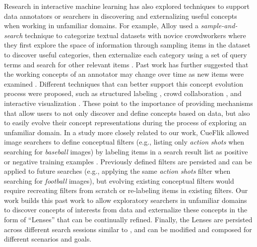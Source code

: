 Research in interactive machine learning has also explored techniques to support data annotators or searchers in discovering and externalizing useful concepts when working in unfamiliar domains. 
For example, Alloy used a \emph{sample-and-search} technique to categorize textual datasets with novice crowdworkers where they first explore the space of information through sampling items in the dataset to discover useful categories, then externalize each category using a set of query terms and search for other relevant items \cite{alloy}.
Past work has further suggested that the working concepts of an annotator may change over time as new items were examined \cite{kulesza2014structured}. Different techniques that can better support this concept evolution process were proposed, such as structured labeling \cite{kulesza2014structured}, crowd collaboration \cite{Chang:2017:Revolt}, and interactive visualization \cite{chen2018anchorviz}.  These point to the importance of providing mechanisms that allow users to not only discover and define concepts based on data, but also to easily evolve their concept representations during the process of exploring an unfamiliar domain.
In a study more closely related to our work, CueFlik allowed image searchers to define conceptual filters (e.g., listing only \emph{action shots} when searching for \emph{baseball} images) by labeling items in a search result list as positive or negative training examples \cite{fogarty2008cueflik}. Previously defined filters are persisted and can be applied to future searches (e.g., applying the same \emph{action shots} filter when searching for \emph{football} images), but evolving existing conceptual filters would require recreating filters from scratch or re-labeling items in existing filters.
Our work builds this past work to allow exploratory searchers in unfamiliar domains to discover concepts of interests from data and externalize these concepts in the form of ``Lenses'' that can be continually refined. Finally, the Lenses are persisted across different search sessions similar to \cite{fogarty2008cueflik}, and can be modified and composed for different scenarios and goals.



